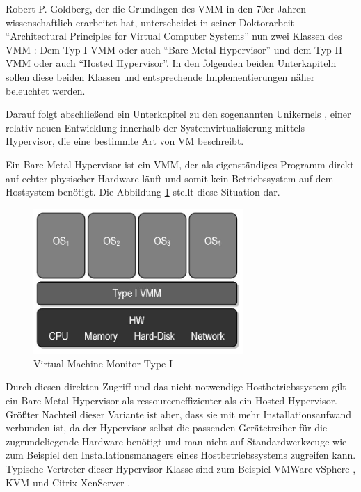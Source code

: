 Robert P. Goldberg, der die Grundlagen des \ac{VMM} in den 70er Jahren wissenschaftlich erarbeitet hat, unterscheidet in seiner Doktorarbeit "`Architectural Principles for Virtual Computer Systems"' nun zwei Klassen des \ac{VMM} \citep[Vgl.][S. 22 ff.]{Goldberg73}: Dem Typ I \ac{VMM} oder auch "`Bare Metal Hypervisor"' und dem Typ II \ac{VMM} oder auch "`Hosted Hypervisor"'. In den folgenden beiden Unterkapiteln sollen diese beiden Klassen und entsprechende Implementierungen näher beleuchtet werden.

Darauf folgt abschließend ein Unterkapitel zu den sogenannten Unikernels \citep[Vgl.][Abstract und Introduction]{MadMorAnd13}, einer relativ neuen Entwicklung innerhalb der Systemvirtualisierung mittels Hypervisor, die eine bestimmte Art von \ac{VM} beschreibt.


Ein Bare Metal Hypervisor ist ein \ac{VMM}, der als eigenständiges Programm direkt auf echter physischer Hardware läuft und somit kein Betriebssystem auf dem Hostsystem benötigt. Die Abbildung \ref{bare} stellt diese Situation dar.

\begin{figure}[!ht]
  \begin{center}
    \includegraphics[width=8cm]{bilder/VMM-Type1.jpg}
    \caption{Virtual Machine Monitor Type I \citep{wiki:002}}
    \label{bare}
  \end{center}
\end{figure}

Durch diesen direkten Zugriff und das nicht notwendige Hostbetriebssystem gilt ein Bare Metal Hypervisor als ressourceneffizienter als ein Hosted Hypervisor. Größter Nachteil dieser Variante ist aber, dass sie mit mehr Installationsaufwand verbunden ist, da der Hypervisor selbst die passenden Gerätetreiber für die zugrundeliegende Hardware benötigt und man nicht auf Standardwerkzeuge wie zum Beispiel den Installationsmanagers eines Hostbetriebssystems zugreifen kann. Typische Vertreter dieser Hypervisor-Klasse sind zum Beispiel VMWare vSphere \citep[Vgl.][]{vmware:001}, KVM und Citrix XenServer \citep[Vgl.][]{xen:001}.

